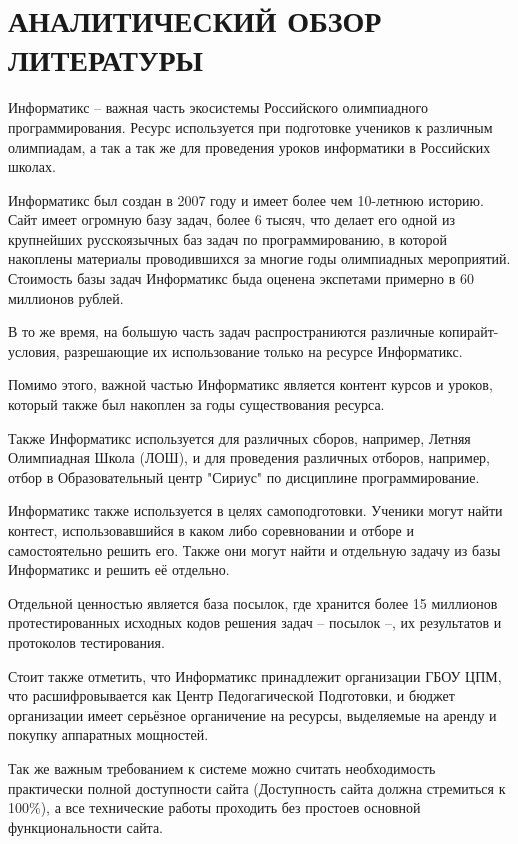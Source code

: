 \chapter[АНАЛИТИЧЕСКИЙ ОБЗОР ЛИТЕРАТУРЫ]{АНАЛИТИЧЕСКИЙ ОБЗОР \\ ЛИТЕРАТУРЫ}

Информатикс -- важная часть экосистемы Российского олимпиадного программирования.
Ресурс используется при подготовке учеников к различным олимпиадам,
а так а так же для проведения уроков информатики в Российских школах.

Информатикс был создан в 2007 году и имеет более чем 10-летнюю историю.
Сайт имеет огромную базу задач, более 6 тысяч, 
что делает его одной из крупнейших русскоязычных баз задач по программированию, в которой накоплены материалы проводившихся за многие годы олимпиадных мероприятий. 
Стоимость базы задач Информатикс быда оценена экспетами примерно в 60 миллионов рублей. 

В то же время, на большую часть задач распространиются различные копирайт-условия, разрешающие их использование только на ресурсе Информатикс.

Помимо этого, важной частью Информатикс является контент курсов и уроков, 
который также был накоплен за годы существования ресурса.

Также Информатикс используется для различных сборов, например, Летняя Олимпиадная Школа (ЛОШ), 
и для проведения различных отборов, например, отбор в Образовательный центр "Сириус" по дисциплине программирование\cite{inf_tinkoff}.

Информатикс также используется в целях самоподготовки.
Ученики могут найти контест, использовавшийся в каком либо соревновании и отборе и самостоятельно решить его.
Также они могут найти и отдельную задачу из базы Информатикс и решить её отдельно.

Отдельной ценностью является база посылок, где хранится более 15 миллионов протестированных исходных кодов решения задач -- посылок --, их результатов и протоколов тестирования. 

Стоит также отметить, что Информатикс принадлежит организации ГБОУ ЦПМ, что расшифровывается как Центр Педогагической Подготовки,
и бюджет организации имеет серьёзное органичение на ресурсы, выделяемые на аренду и покупку аппаратных мощностей.

Так же важным требованием к системе можно считать необходимость практически полной доступности сайта (Доступность сайта должна стремиться к 100\%), 
а все технические работы проходить без простоев основной функциональности сайта.

